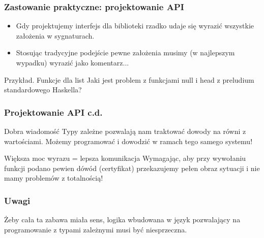 \documentclass{beamer}
\begin{document}
\begin{frame}
\frametitle{Zastowanie praktyczne: projektowanie API}

\begin{itemize}
\item Gdy projektujemy interfejs dla biblioteki 
rzadko udaje się wyrazić wszystkie założenia w sygnaturach.

\item Stosując tradycyjne podejście pewne założenia musimy
(w najlepszym wypadku) wyrazić jako komentarz...
\end{itemize}

\begin{block}{Przykład. Funkcje dla list}
Jaki jest problem z funkcjami null i head z 
preludium standardowego Haskella?
\end{block}



\end{frame}


\begin{frame}
\frametitle{Projektowanie API c.d.}

\begin{block}{Dobra wiadomość}
Typy zależne pozwalają nam traktować dowody na równi z wartościami.
Możemy programować i dowodzić w ramach tego samego systemu!
\end{block}

\begin{block}{Większa moc wyrazu = lepsza komunikacja}
Wymagając, aby przy wywołaniu funkcji podano pewien dówód (certyfikat)
przekazujemy pełen obraz sytuacji i nie mamy problemów z totalnością!
\end{block}


\end{frame}


\begin{frame}
\frametitle{Uwagi}

Żeby cała ta zabawa miała sens, logika wbudowana w
język pozwalający na programowanie z typami zależnymi musi być niesprzeczna.

\end{frame}





\end{document}
